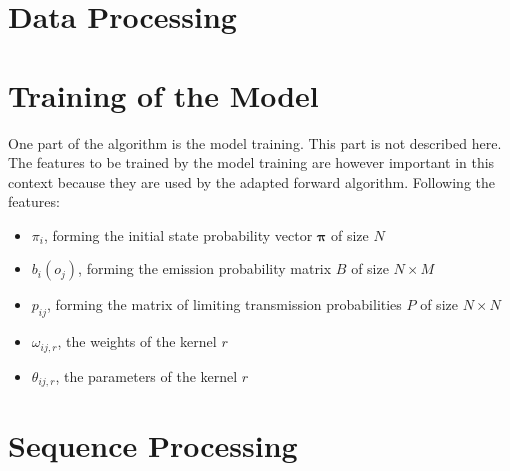 \documentclass[mscthesis]{usiinfthesis}
\begin{document}
\section{Data Processing}
\label{ch:event_data}

\section{Training of the Model}
\label{ch:event_train}

One part of the algorithm is the model training. This part is not described
here. The features to be trained by the model training are however important
in this context because they are used by the adapted forward algorithm.
Following the features:
\begin{itemize}
    \item $ \pi_i $, forming the initial state probability vector
        $ \boldsymbol{\pi} $ of size $ N $
    \item $ b_i(o_j) $, forming the emission probability matrix $ B $ of size
        $ N \times M $
    \item $ p_{ij} $, forming the matrix of limiting transmission probabilities
        $ P $ of size $ N \times N $
    \item $ \omega_{ij, r} $, the weights of the kernel $ r $
    \item $ \theta_{ij, r} $, the parameters of the kernel $ r $
\end{itemize}

\section{Sequence Processing}
\label{ch:event_sequ}
\end{document}

